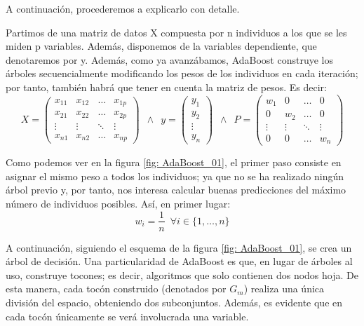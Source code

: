 \documentclass[12pt,twoside]{article}
\begin{document}
A continuación, procederemos a explicarlo con detalle.

Partimos de una matriz de datos X compuesta por n individuos a los que se les miden p variables. Además, disponemos de la variables dependiente, que denotaremos por y. Además, como ya avanzábamos, AdaBoost construye los árboles secuencialmente modificando los pesos de los individuos en cada iteración; por tanto, también habrá que tener en cuenta la matriz de pesos. Es decir:
\begin{equation*}
X =
\begin{pmatrix}
x_{11} & x_{12} & \dots & x_{1p} \\
x_{21} & x_{22} & \dots & x_{2p} \\
\vdots & \vdots & \ddots & \vdots \\
x_{n1} & x_{n2} & \dots & x_{np} 
\end{pmatrix}
\, \, \, 
\wedge
\, \, \,
y = 
\begin{pmatrix}
y_1 \\
y_2 \\
\vdots \\
y_n
\end{pmatrix}
\, \, \,
\wedge
\, \, \,
P =
\begin{pmatrix}
w_1 & 0 & \dots & 0 \\
0 & w_2 & \dots & 0 \\
\vdots & \vdots & \ddots & \vdots \\
0 & 0 & \dots & w_n
\end{pmatrix}
\end{equation*}

Como podemos ver en la figura \ref{fig: AdaBoost_01}, el primer paso consiste en asignar el mismo peso a todos los individuos; ya que no se ha realizado ningún árbol previo y, por tanto, nos interesa calcular buenas predicciones del máximo número de individuos posibles. Así, en primer lugar:
\begin{equation*}
w_i = \frac{1}{n} \, \, \, \forall i \in \{1, \dots, n \}
\end{equation*}

A continuación, siguiendo el esquema de la figura \ref{fig: AdaBoost_01}, se crea un árbol de decisión. Una particularidad de AdaBoost es que, en lugar de árboles al uso, construye tocones; es decir, algoritmos que solo contienen dos nodos hoja. De esta manera, cada tocón construido (denotados por $G_m$) realiza una única división del espacio, obteniendo dos subconjuntos. Además, es evidente que en cada tocón únicamente se verá involucrada una variable.
\end{document}
